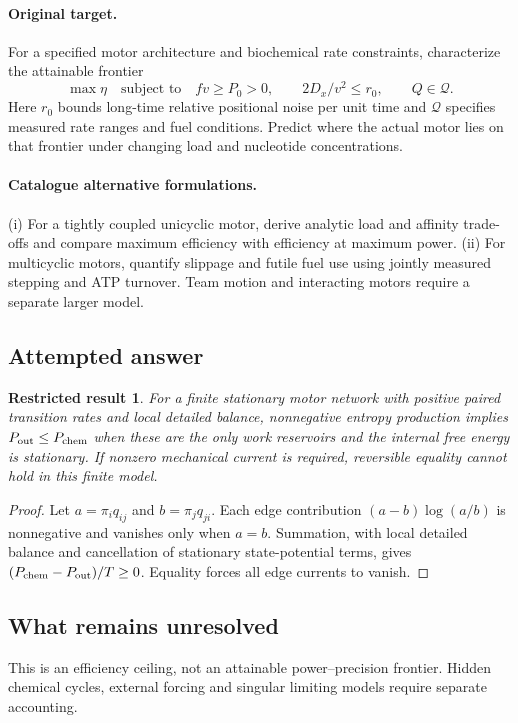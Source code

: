 \documentclass[11pt]{article}
\newtheorem{attemptresult}{Restricted result}[section]
\begin{document}
\paragraph{Original target.}
For a specified motor architecture and biochemical rate constraints, characterize the attainable frontier
\[\max\eta\quad\text{subject to}\quad fv\ge P_0>0,\qquad 2D_x/v^2\le r_0,\qquad Q\in\mathcal Q.\]
Here $r_0$ bounds long-time relative positional noise per unit time and $\mathcal Q$ specifies measured rate ranges and fuel conditions. Predict where the actual motor lies on that frontier under changing load and nucleotide concentrations.
\paragraph{Catalogue alternative formulations.}
(i) For a tightly coupled unicyclic motor, derive analytic load and affinity trade-offs and compare maximum efficiency with efficiency at maximum power. (ii) For multicyclic motors, quantify slippage and futile fuel use using jointly measured stepping and ATP turnover. Team motion and interacting motors require a separate larger model.
\subsection{Attempted answer}
\begin{attemptresult}
For a finite stationary motor network with positive paired transition rates and local detailed balance, nonnegative entropy production implies $P_{\rm out}\leq P_{\rm chem}$ when these are the only work reservoirs and the internal free energy is stationary. If nonzero mechanical current is required, reversible equality cannot hold in this finite model.
\end{attemptresult}
\begin{proof}
Let $a=\pi_iq_{ij}$ and $b=\pi_jq_{ji}$. Each edge contribution $(a-b)\log(a/b)$ is nonnegative and vanishes only when $a=b$. Summation, with local detailed balance and cancellation of stationary state-potential terms, gives $(P_{\rm chem}-P_{\rm out})/T\geq0$. Equality forces all edge currents to vanish.
\end{proof}
\subsection{What remains unresolved}
This is an efficiency ceiling, not an attainable power--precision frontier. Hidden chemical cycles, external forcing and singular limiting models require separate accounting.
\end{document}
